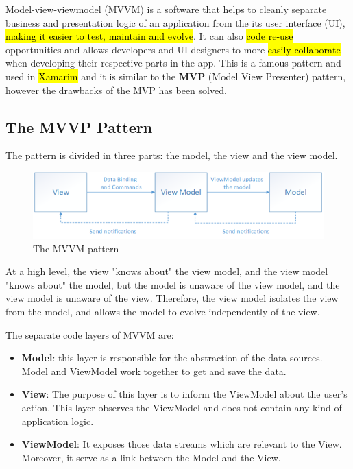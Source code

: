 Model-view-viewmodel (MVVM) is a software that helps to 
cleanly separate business and presentation logic of an
application from the its user interface (UI), \hl{making it
easier to test, maintain and evolve}. It can also \hl{code re-use}
opportunities and allows developers and UI designers to more 
\hl{easily collaborate} when developing their respective parts 
in the app. This is a famous pattern and used in \hl{Xamarim} and 
it is similar to the \textbf{MVP} (Model View Presenter) pattern, however
the drawbacks of the MVP has been solved.

\subsection{The MVVP Pattern}
The pattern is divided in three parts: the model, the view and the 
view model. 

\begin{figure}[h]
\centering
\includegraphics[width=0.8\linewidth]{figures/13_mvvm.png}
\caption{The MVVM pattern}
\label{fig:mvvm_pattern}
\end{figure}


At a high level, the view "knows about" the view model, 
and the view model "knows about" the model, but the model 
is unaware of the view model, and the view model is unaware 
of the view. Therefore, the view model isolates the view from 
the model, and allows the model to evolve independently of the view.


The separate code layers of MVVM are:
\begin{itemize}
    \item \textbf{Model}: this layer is responsible for the abstraction of the 
    data sources. Model and ViewModel work together to get and save the data.
    \item \textbf{View}: The purpose of this layer is to inform the ViewModel 
    about the user's action. This layer observes the ViewModel and does 
    not contain any kind of application logic.
    \item \textbf{ViewModel}:  It exposes those data streams which are relevant to 
    the View. Moreover, it serve as a link between the Model and the View.
\end{itemize}
